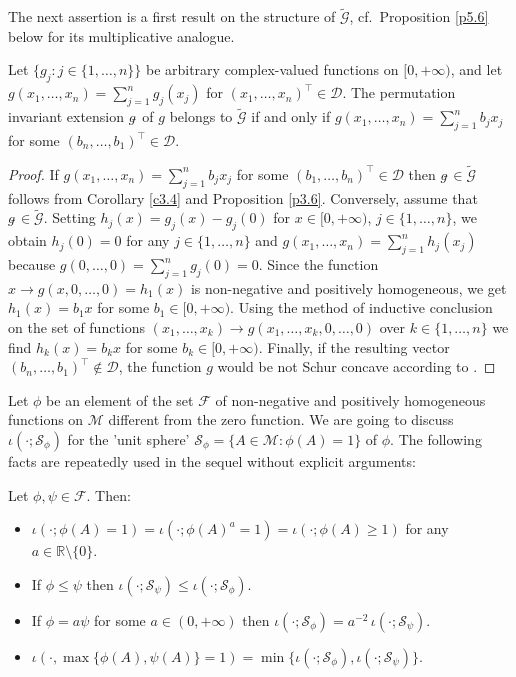 \documentclass{amsart}
\begin{document}
The next assertion is a first result on the structure of $\tilde{{\mathcal G}}$, cf.~Proposition \ref{p5.6} below for its multiplicative analogue. 

\begin{pro}  \label{p3.8}
   Let $\{ g_j : j \in \{ 1, \ldots ,n \} \}$ be arbitrary complex-valued functions on $[0,+\infty)$, and let $g(x_1, \ldots ,x_n) = \sum_{j=1}^n g_j(x_j)$ for $(x_1, \ldots ,x_n)^\top \in {\mathcal D}$. The permutation invariant extension $g\tilde{\,}$ of $g$ belongs to $\tilde{{\mathcal G}}$ if and only if $g(x_1, \ldots ,x_n) = \sum_{j=1}^n b_jx_j$ for some $ (b_n,\ldots,b_1)^\top \in {\mathcal D}$. 
\end{pro}

\begin{proof}
 If $g(x_1, \ldots ,x_n) = \sum_{j=1}^n b_jx_j$ for some $ (b_1,\ldots,b_n)^\top \in {\mathcal D}$ then $g\tilde{\,} \in \tilde{{\mathcal G}}$ follows from Corollary \ref{c3.4} and Proposition \ref{p3.6}. Conversely, assume that $g\tilde{\,} \in \tilde{{\mathcal G}}$. Setting $h_j(x)=g_j(x)-g_j(0)$ for $x \in [0,+\infty)$, $j \in \{ 1,\ldots,n\}$, we obtain $h_j(0)=0$ for any $j \in \{ 1,\ldots,n \}$ and $g(x_1,\ldots,x_n)= \sum_{j=1}^n h_j(x_j)$ because $g(0,\ldots,0)=\sum_{j=1}^n g_j(0) = 0$. Since the function $x \to g(x,0,\ldots,0)=h_1(x)$ is non-negative and positively homogeneous, we get $h_1(x)=b_1x$ for some $b_1 \in [0,+\infty)$. Using the method of inductive conclusion on the set of functions $(x_1,\ldots,x_k) \to g(x_1,\ldots,x_k,0,\ldots,0)$ over $k \in \{ 1,\ldots,n \}$ we find $h_k(x)=b_kx$ for some $b_k \in [0,+\infty)$. Finally, if the resulting vector $(b_n,\ldots,b_1)^\top \not\in {\mathcal D}$, the function $g$ would be not Schur concave according to \cite[Thm.~3.A.3]{MOA}. 
\end{proof}

Let $\phi$ be an element of the set $\mathcal F$ of non-negative and positively homogeneous functions on $\mathcal M$ different from the zero function. We are going to discuss $\iota( \cdot; {\mathcal S}_\phi)$ for the 'unit sphere' ${\mathcal S}_\phi = \{ A \in {\mathcal M}: \phi(A)=1 \}$ of $\phi$. The following facts are repeatedly used in the sequel without explicit arguments:

\begin{lem} \label{l3.9}
   Let $\phi, \psi \in \mathcal F$. Then:
   \begin{itemize}
   \item[(i)] $\iota( \cdot; \phi(A)=1 ) = \iota( \cdot; \phi(A)^a=1 ) = \iota( \cdot; \phi(A) \geq 1)$ for any $a \in {\mathbb R} \setminus \{0\}$.
   \item[(ii)] If $\phi \leq \psi$ then $\iota( \cdot ; {\mathcal S}_\psi) \leq \iota( \cdot ; {\mathcal S}_\phi)$.
   \item[(iii)] If $\phi = a \psi$ for some $a \in (0,+\infty)$ then $\iota( \cdot ; {\mathcal S}_\phi) = a^{-2} \, \iota( \cdot ; {\mathcal S}_\psi)$.
   \item[(iv)] $\iota( \cdot , \max \{ \phi(A), \psi(A)\} =1 ) = \min \{ \iota( \cdot ; {\mathcal S}_\phi), \iota( \cdot ; {\mathcal S}_\psi) \}$.
   \end{itemize}
\end{lem}
\end{document}
